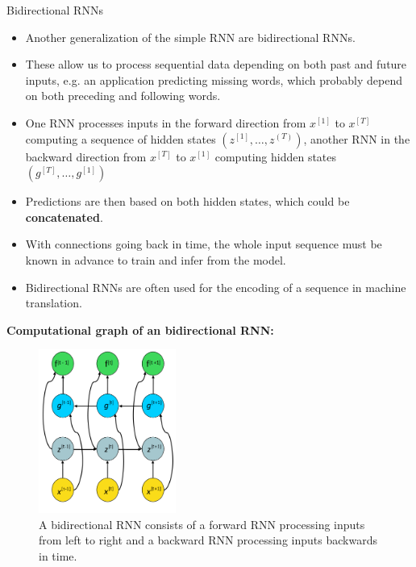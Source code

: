 \begin{vbframe}{Bidirectional RNNs}
  \begin{itemize}
    \item Another generalization of the simple RNN are bidirectional RNNs.
    \item These allow us to process sequential data depending on both past and future inputs, e.g. an application predicting missing words, which probably depend on both preceding and following words.
    \item One RNN processes inputs in the forward direction from $x^{[1]}$ to $x^{[T]}$ computing a sequence of hidden states $(z^{[1]}, \dots, z^{(T)})$, another RNN in the backward direction from $x^{[T]}$ to $x^{[1]}$ computing hidden states $(g^{[T]}, \dots, g^{[1]})$
    \item Predictions are then based on both hidden states, which could be \textbf{concatenated}.
    \item With connections going back in time, the whole input sequence must be known in advance
to train and infer from the model.
    \item Bidirectional RNNs are often used for the encoding of a sequence in machine translation.
  \end{itemize}
\framebreak  
\textbf{Computational graph of an bidirectional RNN:}
  \begin{figure}
    \includegraphics[width=4.5cm]{figure/bidirectional_rnn.png}
    \caption{A bidirectional RNN consists of a forward RNN processing inputs from left to right and a backward RNN processing inputs backwards in time.}
  \end{figure} 
\end{vbframe}


